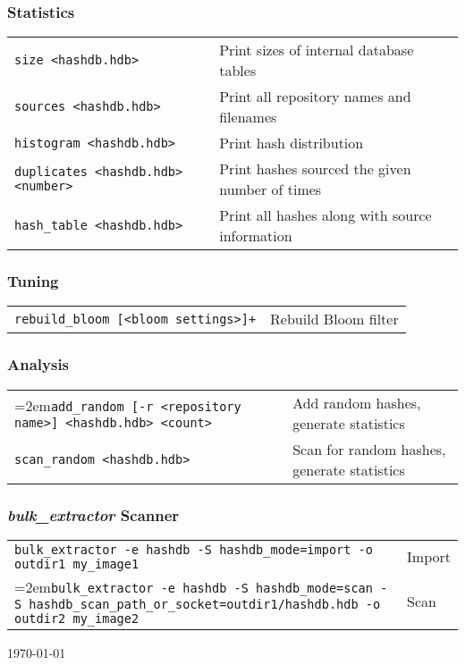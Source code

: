 \documentclass[12pt]{article}
\newcommand{\bulk}{\emph{bulk\_extractor}\xspace}
\begin{document}
\subsubsection*{Statistics}
\begin{tabular}{p{8 cm} p{9 cm} }
\texttt{size <hashdb.hdb>} & Print sizes of internal database tables \\
\texttt{sources <hashdb.hdb>} & Print all repository names and filenames \\
\texttt{histogram <hashdb.hdb>} & Print hash distribution \\
\texttt{duplicates <hashdb.hdb> <number>} & Print hashes sourced the given number of times \\
\texttt{hash\_table <hashdb.hdb>} & Print all hashes along with source information\\
\end{tabular}

\subsubsection*{Tuning}
\begin{tabular}{p{8 cm} p{9 cm} }
\texttt{rebuild\_bloom [<bloom settings>]+} & Rebuild Bloom filter \\
\end{tabular}

\subsubsection*{Analysis}
\begin{tabular}{p{8 cm} p{9 cm} }
\hangindent=2em\texttt{add\_random [-r <repository name>] <hashdb.hdb> <count>} & Add random hashes, generate statistics \\
\texttt{scan\_random <hashdb.hdb>} & Scan for random hashes, generate statistics \\
\end{tabular}

\subsubsection*{\bulk Scanner}
\begin{tabular}{p{15 cm} p{4 cm} }
\texttt{bulk\_extractor -e hashdb -S hashdb\_mode=import -o outdir1 my\_image1} & Import \\
\hangindent=2em\texttt{bulk\_extractor -e hashdb -S hashdb\_mode=scan -S hashdb\_scan\_path\_or\_socket=outdir1/hashdb.hdb -o outdir2 my\_image2} & Scan \\
\end{tabular}

\vspace{2mm}
\begin{center}
\begin{footnotesize}
\today
\end{footnotesize}
\end{center}
\end{document}

